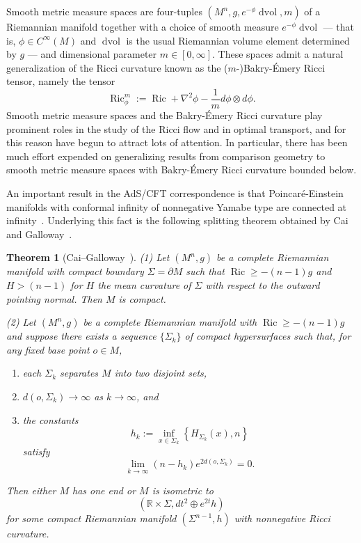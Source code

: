 \documentclass{amsart}
\newtheorem{thm}{Theorem}[section]
\theoremstyle{definition}
\theoremstyle{remark}
\numberwithin{equation}{section}
\begin{document}
Smooth metric measure spaces are four-tuples $(M^n,g,e^{-\phi}\operatorname{dvol},m)$ of a Riemannian manifold together with a choice of smooth measure $e^{-\phi}\operatorname{dvol}$ --- that is, $\phi\in C^\infty(M)$ and $\operatorname{dvol}$ is the usual Riemannian volume element determined by $g$ --- and dimensional parameter $m\in[0,\infty]$.  These spaces admit a natural generalization of the Ricci curvature known as the ($m$-)Bakry-\'Emery Ricci tensor, namely the tensor
\[ \operatorname{Ric}_\phi^m := \operatorname{Ric} + \nabla^2\phi - \frac{1}{m}d\phi\otimes d\phi . \]
Smooth metric measure spaces and the Bakry-\'Emery Ricci curvature play prominent roles in the study of the Ricci flow and in optimal transport, and for this reason have begun to attract lots of attention.  In particular, there has been much effort expended on generalizing results from comparison geometry to smooth metric measure spaces with Bakry-\'Emery Ricci curvature bounded below.

An important result in the AdS/CFT correspondence is that Poincar\'e-Einstein manifolds with conformal infinity of nonnegative Yamabe type are connected at infinity~\cite{CaiGalloway1999,WittenYau1999}.  Underlying this fact is the following splitting theorem obtained by Cai and Galloway~\cite{CaiGalloway1999}.

\begin{thm}[Cai--Galloway~\cite{CaiGalloway1999}]
\label{thm:cg}
(1) Let $(M^n,g)$ be a complete Riemannian manifold with compact boundary $\Sigma=\partial M$ such that $\operatorname{Ric}\geq-(n-1)g$ and $H>(n-1)$ for $H$ the mean curvature of $\Sigma$ with respect to the outward pointing normal.  Then $M$ is compact.

(2) Let $(M^n,g)$ be a complete Riemannian manifold with $\operatorname{Ric}\geq-(n-1)g$ and suppose there exists a sequence $\{\Sigma_k\}$ of compact hypersurfaces such that, for any fixed base point $o\in M$,
\begin{enumerate}
\item each $\Sigma_k$ separates $M$ into two disjoint sets,
\item $d(o,\Sigma_k)\to\infty$ as $k\to\infty$, and
\item the constants
\[ h_k := \inf_{x\in\Sigma_k} \left\{ H_{\Sigma_k}(x), n \right\} \]
satisfy
\begin{equation}
\label{eqn:cg_mean_curvature}
\lim_{k\to\infty} \left(n-h_k\right)e^{2d(o,\Sigma_k)} = 0 .
\end{equation}
\end{enumerate}
Then either $M$ has one end or $M$ is isometric to
\[ \left( {\mathbb{R}}\times\Sigma, dt^2\oplus e^{2t}h \right) \]
for some compact Riemannian manifold $(\Sigma^{n-1},h)$ with nonnegative Ricci curvature.
\end{thm}
\end{document}
